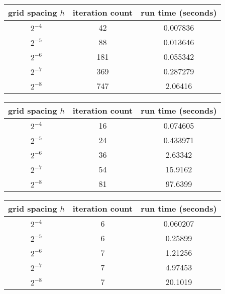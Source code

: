 \documentclass[12pt]{article}
\begin{document}
\begin{center}
\begin{tabular}{||c|c|c||}
\hline \hline
   grid spacing $h$ &   iteration count &   run time (seconds) \\
\hline \hline
       $2^{-4}$    &                42 &             0.007836 \\
       $2^{-5}$    &                88 &             0.013646 \\
       $2^{-6}$   &               181 &             0.055342 \\
       $2^{-7}$  &               369 &             0.287279 \\
       $2^{-8}$ &               747 &             2.06416  \\
\hline \hline
\end{tabular}
\end{center}
\begin{center}
\begin{tabular}{||c|c|c||}
\hline \hline
   grid spacing $h$ &   iteration count &   run time (seconds) \\
\hline \hline
       $2^{-4}$    &                16 &             0.074605 \\
       $2^{-5}$    &                24 &             0.433971 \\
       $2^{-6}$   &                36 &             2.63342  \\
       $2^{-7}$  &                54 &            15.9162   \\
       $2^{-8}$ &                81 &            97.6399   \\
\hline \hline
\end{tabular}
\end{center}
\begin{center}
\begin{tabular}{||c|c|c||}
\hline \hline
   grid spacing $h$ &   iteration count &   run time (seconds) \\
\hline \hline
       $2^{-4}$    &                 6 &             0.060207 \\
       $2^{-5}$        &                 6 &             0.25899  \\
       $2^{-6}$       &                 7 &             1.21256  \\
       $2^{-7}$      &                 7 &             4.97453  \\
       $2^{-8}$     &                 7 &            20.1019   \\
\hline \hline
\end{tabular}
\end{center}
\end{document}
